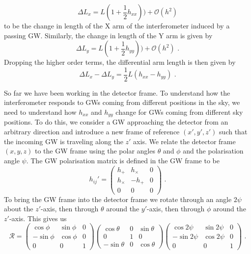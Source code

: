 \documentclass[11pt]{cuthesis}
\newcommand{\fs}{\text{ .}}
\begin{document}
\begin{equation}
\Delta L_x = L (1 + \frac{1}{2}h_{xx})) + \mathcal{O}(h^2)
\end{equation} 
to be the change in length of the X arm of the interferometer induced by a passing GW. Similarly, the change in length of the Y arm is given by
\begin{equation}
\Delta L_y = L (1 + \frac{1}{2}h_{yy}))  + \mathcal{O}(h^2) \fs
\end{equation} 
Dropping the higher order terms, the differential arm length is then given by
\begin{equation} \label{darm eqn}
\Delta L_x - \Delta L_y = \frac{1}{2} L(h_{xx} - h_{yy}) \fs
\end{equation}

So far we have been working in the detector frame. To understand how the interferometer responds to GWs coming from different positions in the sky, we need to understand how $h_{xx}$ and $h_{yy}$ change for GWs coming from different sky positions. To do this, we consider a GW approaching the detector from an arbitrary direction and introduce a new frame of reference $(x',y',z')$ such that the incoming GW is traveling along the $z'$ axis. We relate the detector frame $(x,y,z)$ to the GW frame using the polar angles $\theta$ and $\phi$ and the polarisation angle $\psi$. The GW polarisation matrix is defined in the GW frame to be
\begin{equation}
h_{ij}'
=
\begin{pmatrix}
h_+ & h_\times & 0 \\
h_\times & -h_+ & 0 \\
0 & 0 & 0
\end{pmatrix} \fs
\end{equation}
To bring the GW frame into the detector frame we rotate through an angle $2\psi$ about the $z'$-axis, then through $\theta$ around the $y'$-axis, then through $\phi$ around the $z'$-axis. This gives us
\begin{equation}
\mathcal{R}
=
\begin{pmatrix}
\cos \phi & \sin \phi & 0 \\
-\sin \phi & \cos \phi & 0 \\
0 & 0 & 1
\end{pmatrix}
\begin{pmatrix}
\cos \theta & 0 & \sin \theta \\
0 & 1 & 0 \\
-\sin \theta & 0 & \cos \theta
\end{pmatrix}
\begin{pmatrix}
\cos 2\psi & \sin 2\psi & 0 \\
-\sin 2\psi & \cos 2\psi & 0 \\
0 & 0 & 1
\end{pmatrix}
 \fs
\end{equation}
\end{document}
